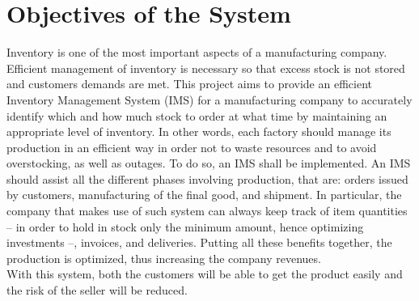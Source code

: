 \section{Objectives of the System}
Inventory is one of the most important aspects of a manufacturing company. Efficient management of inventory is necessary so that excess stock is not stored and customers demands are met. This project aims to provide an efficient Inventory Management System (IMS) for a manufacturing company to accurately identify which and how much stock to order at what time by maintaining an appropriate level of inventory. In other words, each factory should manage its production in an efficient way in order not to waste resources and to avoid overstocking, as well as outages. To do so, an IMS shall be implemented. An IMS should assist all the different phases involving production, that are: orders issued by customers, manufacturing of the final good, and shipment. In particular, the company that makes use of such system can always keep track of item quantities -- in order to hold in stock only the minimum amount, hence optimizing investments --, invoices, and deliveries. Putting all these benefits together, the production is optimized, thus increasing the company revenues.\\
With this system, both the customers will be able to get the product easily and the risk of the seller will be reduced.
